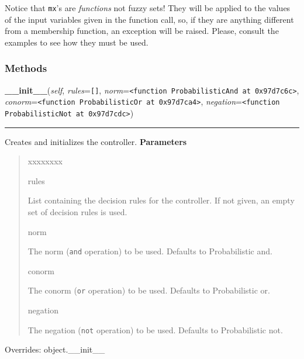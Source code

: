 Notice that \texttt{mx}'s are \emph{functions} not fuzzy sets! They will be applied to
the values of the input variables given in the function call, so, if they
are anything different from a membership function, an exception will be
raised. Please, consult the examples to see how they must be used.


  \subsubsection{Methods}

    \vspace{0.5ex}

\hspace{.8\funcindent}\begin{boxedminipage}{\funcwidth}

    \raggedright \textbf{\_\_init\_\_}(\textit{self}, \textit{rules}={\tt \texttt{[}\texttt{]}}, \textit{norm}={\tt {\textless}function ProbabilisticAnd at 0x97d7c6c{\textgreater}}, \textit{conorm}={\tt {\textless}function ProbabilisticOr at 0x97d7ca4{\textgreater}}, \textit{negation}={\tt {\textless}function ProbabilisticNot at 0x97d7cdc{\textgreater}})

    \vspace{-1.5ex}

    \rule{\textwidth}{0.5\fboxrule}
\setlength{\parskip}{2ex}

Creates and initializes the controller.
\setlength{\parskip}{1ex}
      \textbf{Parameters}
      \vspace{-1ex}

      \begin{quote}
        \begin{Ventry}{xxxxxxxx}

          \item[rules]


List containing the decision rules for the controller. If not given,
an empty set of decision rules is used.
          \item[norm]


The norm (\texttt{and} operation) to be used. Defaults to Probabilistic
and.
          \item[conorm]


The conorm (\texttt{or} operation) to be used. Defaults to Probabilistic
or.
          \item[negation]


The negation (\texttt{not} operation) to be used. Defaults to
Probabilistic not.
        \end{Ventry}

      \end{quote}

      Overrides: object.\_\_init\_\_

    \end{boxedminipage}

